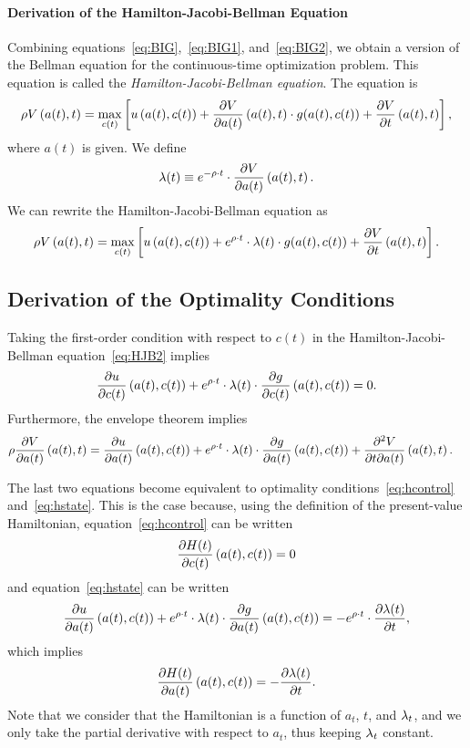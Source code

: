 \documentclass[letterpaper,12pt,leqno]{article}
\begin{document}
\paragraph{Derivation of the Hamilton-Jacobi-Bellman Equation} Combining equations~\eqref{eq:BIG},~\eqref{eq:BIG1}, and~\eqref{eq:BIG2}, we obtain a version of the Bellman equation for the continuous-time optimization problem. This equation is called the \textit{Hamilton-Jacobi-Bellman equation}. The equation is
\begin{equation}
\r V\bp{ a(t),t} =\max_{c(t)}\bs{ u\bp{a(t),c(t)} +\pd{V}{a(t)}\bp{a(t),t}\cdot
g(a(t),c(t)) +\pd{V}{t}\bp{a(t),t}}, \label{eq:HJB}
\end{equation}
where $a(t)$ is given. We define \[\lambda (t)\equiv e^{-\rho \cdot t}\cdot \frac{\partial V}{\partial a(t)}\left( a(t),t \right).\]
We can rewrite the Hamilton-Jacobi-Bellman equation as
\begin{equation}
\r V\bp{ a(t),t} =\max_{c(t)}\bs{ u\bp{a(t),c(t)} +e^{\r \cdot t}\cdot\l (t)  \cdot
g(a(t),c(t)) +\pd{V}{t}\bp{a(t),t}}. \label{eq:HJB2}
\end{equation}

\subsection{Derivation of the Optimality Conditions}

Taking the first-order condition with respect to $c(t)$ in the Hamilton-Jacobi-Bellman equation~\eqref{eq:HJB2} implies
\begin{equation*}
\frac{\partial u}{\partial c(t)}\left( a(t),c(t) \right)+e^{\rho \cdot t}\cdot\lambda (t) \cdot \frac{\partial g}{\partial c(t)}\left( a(t),c(t) \right)=0.
\end{equation*}
Furthermore, the envelope theorem implies
\begin{align*}
\rho \frac{\partial V}{\partial a(t)}\left( a(t),t \right)&=\frac{\partial u}{\partial a(t)}\left( a(t),c(t) \right)+e^{\rho \cdot t}\cdot\lambda (t)\cdot \frac{\partial g}{\partial a(t)}\left(  a(t),c(t) \right)+\frac{\partial^{2}V}{\partial t\partial a(t)}\left( a(t),t \right).
\end{align*}

The last two equations become equivalent to optimality conditions~\eqref{eq:hcontrol} and~\eqref{eq:hstate}. This is the case because, using the definition of the present-value Hamiltonian, equation~\eqref{eq:hcontrol} can be written
\[\frac{\partial H(t)}{\partial c(t)}\left( a(t),c(t) \right) =0\]
and equation~\eqref{eq:hstate} can be written
\[\frac{\partial u}{\partial a(t)}\left( a(t),c(t) \right) +e^{\rho\cdot  t}\cdot \lambda(t)\cdot \frac{\partial g}{\partial a(t)}\left( a(t),c(t) \right)=-e^{\rho\cdot  t}\cdot \frac{\partial \lambda(t)}{\partial t},\]
which implies
\[\frac{\partial H(t)}{\partial a(t)}\left( a(t),c(t) \right) =-\frac{\partial \lambda(t)}{\partial t}.\]
Note that we consider that the Hamiltonian is a function of $a_{t}$, $t$, and $\lambda_{t}$, and we only take the partial derivative with respect to $a_{t}$, thus keeping $\lambda_{t}$ constant.
\end{document}
